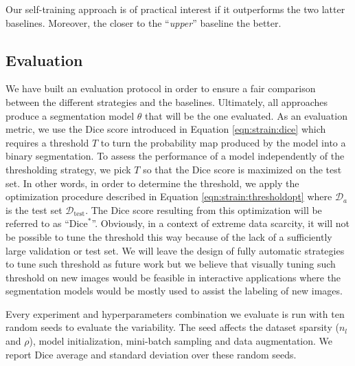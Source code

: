 Our self-training approach is of practical interest if it outperforms the two latter baselines. Moreover, the closer to the ``\textit{upper}'' baseline the better.

\subsection{Evaluation}
\label{ssec:strain:evaluation}

We have built an evaluation protocol in order to ensure a fair comparison between the different strategies and the baselines. Ultimately, all approaches produce a segmentation model $\theta$ that will be the one evaluated. As an evaluation metric, we use the Dice score introduced in Equation \ref{eqn:strain:dice} which requires a threshold $T$ to turn the probability map produced by the model into a binary segmentation. To assess the performance of a model independently of the thresholding strategy, we pick $T$ so that the Dice score is maximized on the test set. In other words, in order to determine the threshold, we apply the optimization procedure described in Equation \ref{eqn:strain:thresholdopt} where $\mathcal{D}_a$ is the test set $\mathcal{D}_{\text{test}}$. The Dice score resulting from this optimization will be referred to as ``$\text{Dice}^*$''. Obviously, in a context of extreme data scarcity, it will not be possible to tune the threshold this way because of the lack of a sufficiently large validation or test set. We will leave the design of fully automatic strategies to tune such threshold as future work but we believe that visually tuning such threshold on new images would be feasible in interactive applications where the segmentation models would be mostly used to assist the labeling of new images.

Every experiment and hyperparameters combination we evaluate is run with ten random seeds to evaluate the variability. The seed affects the dataset sparsity ($n_l$ and $\rho$), model initialization, mini-batch sampling and data augmentation. We report Dice average and standard deviation over these random seeds.  


